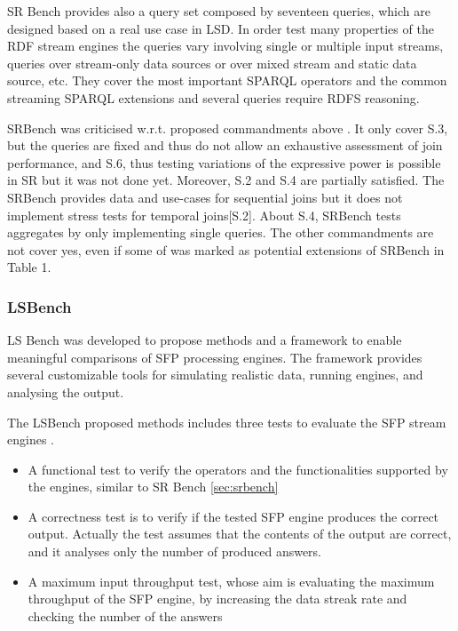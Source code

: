SR Bench provides also a query set composed by seventeen queries, which are designed based on a real use case in LSD. In order test many properties of the RDF stream engines the queries vary involving single or multiple input streams, queries over stream-only data sources or over mixed stream and static data source, etc. They cover the most important SPARQL operators and the common streaming SPARQL extensions and several queries require RDFS reasoning.

SRBench was criticised w.r.t. proposed commandments above \cite{DBLP:conf/esws/ScharrenbachUMVB13}. It only cover S.3, but the queries are fixed  and thus do not allow an exhaustive assessment of join performance, and S.6, thus testing variations of the expressive power is possible in SR but it was not done yet. Moreover, S.2 and S.4 are partially satisfied. The SRBench provides data and use-cases for sequential joins but it does not implement stress tests for temporal joins[S.2]. About S.4, SRBench  tests aggregates  by only implementing single queries. The other commandments are not cover yes, even if some of was marked as potential extensions of SRBench in \cite{DBLP:conf/esws/ScharrenbachUMVB13} Table 1.

\subsubsection{LSBench}\label{sec:lsbench}

LS Bench was developed to propose methods and a framework to enable  meaningful comparisons of SFP processing engines. The framework provides several customizable tools for simulating realistic data, running engines, and analysing the output. 

The LSBench proposed methods includes three tests to evaluate the SFP stream engines \cite{DBLP:conf/semweb/DellAglioCBCV13}. \begin{itemize}
\item A functional test to verify the operators and the functionalities supported
by the engines, similar to SR Bench \ref{sec:srbench}
\item A correctness test is to verify if the tested SFP engine produces the correct output. Actually the test assumes that the contents of the output are correct, and it analyses only the number of produced answers.
\item A maximum input throughput test, whose aim is evaluating the maximum throughput of the SFP engine, by increasing the data streak rate and checking the number of the answers
\end{itemize}

